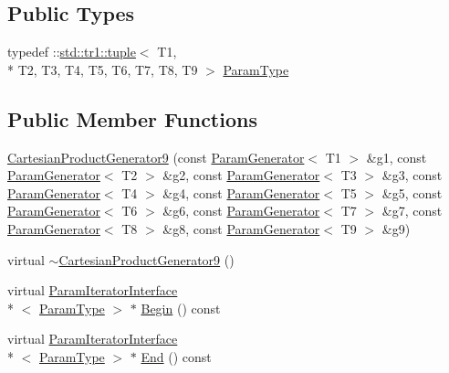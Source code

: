 \subsection*{Public Types}
\begin{DoxyCompactItemize}
\item 
typedef \-::\hyperlink{classstd_1_1tr1_1_1tuple}{std\-::tr1\-::tuple}$<$ T1, \\*
T2, T3, T4, T5, T6, T7, T8, T9 $>$ \hyperlink{classtesting_1_1internal_1_1CartesianProductGenerator9_a333de873be0c11965024ad94d5e958d9}{Param\-Type}
\end{DoxyCompactItemize}
\subsection*{Public Member Functions}
\begin{DoxyCompactItemize}
\item 
\hyperlink{classtesting_1_1internal_1_1CartesianProductGenerator9_aff06c7992c06297c6bf5ad5eb56534e9}{Cartesian\-Product\-Generator9} (const \hyperlink{classtesting_1_1internal_1_1ParamGenerator}{Param\-Generator}$<$ T1 $>$ \&g1, const \hyperlink{classtesting_1_1internal_1_1ParamGenerator}{Param\-Generator}$<$ T2 $>$ \&g2, const \hyperlink{classtesting_1_1internal_1_1ParamGenerator}{Param\-Generator}$<$ T3 $>$ \&g3, const \hyperlink{classtesting_1_1internal_1_1ParamGenerator}{Param\-Generator}$<$ T4 $>$ \&g4, const \hyperlink{classtesting_1_1internal_1_1ParamGenerator}{Param\-Generator}$<$ T5 $>$ \&g5, const \hyperlink{classtesting_1_1internal_1_1ParamGenerator}{Param\-Generator}$<$ T6 $>$ \&g6, const \hyperlink{classtesting_1_1internal_1_1ParamGenerator}{Param\-Generator}$<$ T7 $>$ \&g7, const \hyperlink{classtesting_1_1internal_1_1ParamGenerator}{Param\-Generator}$<$ T8 $>$ \&g8, const \hyperlink{classtesting_1_1internal_1_1ParamGenerator}{Param\-Generator}$<$ T9 $>$ \&g9)
\item 
virtual \hyperlink{classtesting_1_1internal_1_1CartesianProductGenerator9_a87b0f2bf8e24af0e3feb1114bad4af4f}{$\sim$\-Cartesian\-Product\-Generator9} ()
\item 
virtual \hyperlink{classtesting_1_1internal_1_1ParamIteratorInterface}{Param\-Iterator\-Interface}\\*
$<$ \hyperlink{classtesting_1_1internal_1_1CartesianProductGenerator9_a333de873be0c11965024ad94d5e958d9}{Param\-Type} $>$ $\ast$ \hyperlink{classtesting_1_1internal_1_1CartesianProductGenerator9_a346f369cf3b1bf866d47f17074f13d13}{Begin} () const 
\item 
virtual \hyperlink{classtesting_1_1internal_1_1ParamIteratorInterface}{Param\-Iterator\-Interface}\\*
$<$ \hyperlink{classtesting_1_1internal_1_1CartesianProductGenerator9_a333de873be0c11965024ad94d5e958d9}{Param\-Type} $>$ $\ast$ \hyperlink{classtesting_1_1internal_1_1CartesianProductGenerator9_af00c2840f7270a74c2104fead936498e}{End} () const 
\end{DoxyCompactItemize}


